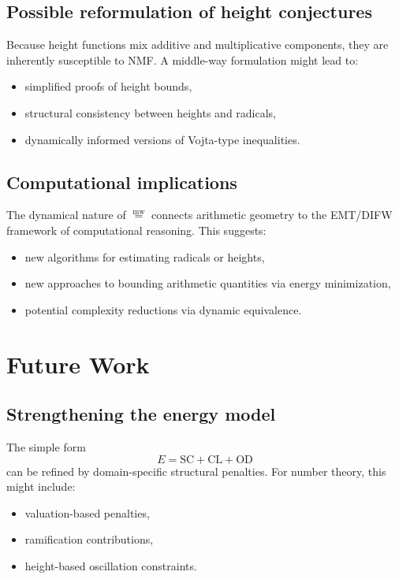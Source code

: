 \documentclass[11pt]{article}
\newcommand{\mweq}{\mathrel{\overset{\mathrm{mw}}{=}}}
\theoremstyle{definition}
\theoremstyle{remark}
\begin{document}
\subsection{Possible reformulation of height conjectures}

Because height functions mix additive and multiplicative components,
they are inherently susceptible to NMF. A middle-way formulation might
lead to:

\begin{itemize}
  \item simplified proofs of height bounds,
  \item structural consistency between heights and radicals,
  \item dynamically informed versions of Vojta-type inequalities.
\end{itemize}

\subsection{Computational implications}

The dynamical nature of $\mweq$ connects arithmetic geometry to the
EMT/DIFW framework of computational reasoning. This suggests:

\begin{itemize}
  \item new algorithms for estimating radicals or heights,
  \item new approaches to bounding arithmetic quantities via energy
        minimization,
  \item potential complexity reductions via dynamic equivalence.
\end{itemize}

\section{Future Work}

\subsection{Strengthening the energy model}

The simple form
\[
  E = \mathrm{SC} + \mathrm{CL} + \mathrm{OD}
\]
can be refined by domain-specific structural penalties. For number
theory, this might include:

\begin{itemize}
  \item valuation-based penalties,
  \item ramification contributions,
  \item height-based oscillation constraints.
\end{itemize}
\end{document}
